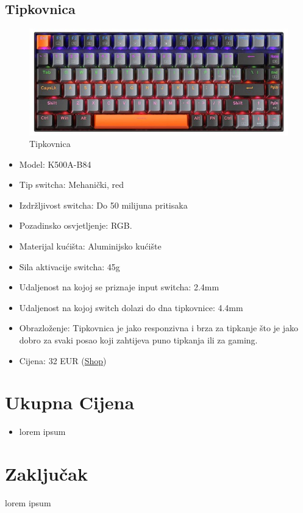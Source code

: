 \documentclass{article}
\begin{document}
\subsection{Tipkovnica}
\begin{figure}[H]
    \centering
    \includegraphics[width = \textwidth]{Slike/Tipkovnica..jpg}
    \caption{Tipkovnica}
    \label{fig:Tipkovnica}
\end{figure}
\begin{itemize}
    \item Model: K500A-B84
    \item Tip switcha: Mehanički, red
    \item Izdržljivost switcha: Do 50 milijuna pritisaka
    \item Pozadinsko osvjetljenje: RGB.
    \item Materijal kućišta: Aluminijsko kućište
    \item Sila aktivacije switcha: 45g
    \item Udaljenost na kojoj se priznaje input switcha: 2.4mm
    \item Udaljenost na kojoj switch dolazi do dna tipkovnice: 4.4mm
    \item Obrazloženje: Tipkovnica je jako responzivna i brza za tipkanje što je jako dobro za svaki posao koji zahtijeva puno tipkanja ili za gaming.
    \item Cijena: 32 EUR (\href{https://www.aliexpress.com/item/1005005958708733.html?spm=a2g0o.order_list.order_list_main.5.51111802yyqjTU}{Shop})
\end{itemize}

\section{Ukupna Cijena}
\begin{itemize}
    \item lorem ipsum
\end{itemize}

\section{Zaključak}
lorem ipsum     
\end{document}
